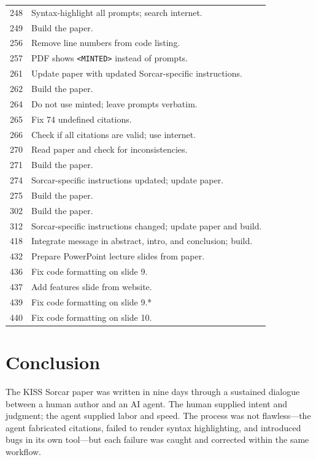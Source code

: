 \documentclass{article}
\begin{document}
\begin{longtable}{rp{}}
248 & Syntax-highlight all prompts; search internet. \\
249 & Build the paper. \\
256 & Remove line numbers from code listing. \\
257 & PDF shows \texttt{<MINTED>} instead of prompts. \\
261 & Update paper with updated Sorcar-specific instructions. \\
262 & Build the paper. \\
264 & Do not use minted; leave prompts verbatim. \\
265 & Fix 74 undefined citations. \\
266 & Check if all citations are valid; use internet. \\
270 & Read paper and check for inconsistencies. \\
271 & Build the paper. \\
274 & Sorcar-specific instructions updated; update paper. \\
275 & Build the paper. \\
302 & Build the paper. \\
312 & Sorcar-specific instructions changed; update paper and build. \\
418 & Integrate message in abstract, intro, and conclusion; build. \\
432 & Prepare PowerPoint lecture slides from paper. \\
436 & Fix code formatting on slide 9. \\
437 & Add features slide from website. \\
439 & Fix code formatting on slide 9.* \\
440 & Fix code formatting on slide 10. \\
\end{longtable}

\section{Conclusion}
\label{sec:conclusion}

The KISS Sorcar paper was written in nine days through a sustained dialogue between a human author and an AI agent.  The human supplied intent and judgment; the agent supplied labor and speed.  The process was not flawless---the agent fabricated citations, failed to render syntax highlighting, and introduced bugs in its own tool---but each failure was caught and corrected within the same workflow.
\end{document}
